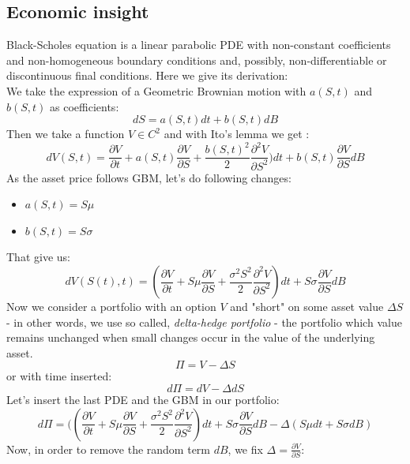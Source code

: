\documentclass[a4paper]{report}
\begin{document}
\begin{itemize}
\subsection{Economic insight}
Black-Scholes equation is a linear parabolic PDE with non-constant coefficients and non-homogeneous
boundary conditions and, possibly, non-differentiable or discontinuous final
conditions. Here we give its derivation:\\
We take the expression of a Geometric Brownian motion with $a(S,t)$ and $b(S,t)$ as coefficients:
\begin{equation}
dS = a(S,t)dt+b(S,t)dB
\end{equation}
Then we take a function $V \in C^2$ and with Ito's lemma we get :
\begin{equation}
dV(S,t) = \frac{\partial V}{\partial t}  + a(S,t) \frac{\partial V}{\partial S}  +    \frac{b(S,t)^2}{2}  \frac{\partial^2 V}{\partial S^2}) dt + b(S,t) \frac{\partial V}{\partial S}dB
\end{equation}
As the asset price follows GBM, let's do following changes: 
\begin{itemize}
\item $a(S,t)=S\mu$
\item $b(S,t)=S\sigma$
\end{itemize}
That give us:
\begin{equation}
dV(S(t),t) = (\frac{\partial V}{\partial t}  + S\mu \frac{\partial V}{\partial S}  +    \frac{\sigma^2 S^2}{2}  \frac{\partial^2 V}{\partial S^2}) dt + S\sigma \frac{\partial V}{\partial S}dB
\end{equation}
Now we consider a portfolio  with an option $V$ and "short" on some asset value $\Delta S$ - in other words, we use so called, \textit{delta-hedge portfolio} - the portfolio which value remains unchanged when small changes occur in the value of the underlying asset.\\
\begin{equation}
\Pi=V-\Delta S
\end{equation}
or with time inserted:
\begin{equation}
d\Pi=dV-\Delta dS
\end{equation}
Let's insert the last PDE and the GBM in our portfolio: 
\begin{equation}
d\Pi = ((\frac{\partial V}{\partial t}  + S\mu \frac{\partial V}{\partial S}  +    \frac{\sigma^2 S^2}{2}  \frac{\partial^2 V}{\partial S^2}) dt + S\sigma \frac{\partial V}{\partial S}dB-\Delta(S\mu dt+S\sigma dB)
\end{equation}
Now, in order to remove the random term $dB$, we fix $\Delta=\frac{\partial V}{\partial S}$:


\end{itemize}
\end{document}
